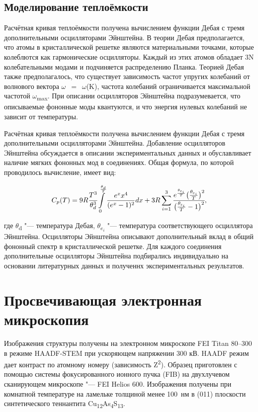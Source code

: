 \subsection{Моделирование теплоёмкости}\label{sect2_4_2}
Расчётная кривая теплоёмкости получена вычислением функции Дебая с тремя дополнительными осцилляторами Эйнштейна. В теории Дебая предполагается, что атомы в кристаллической решетке являются материальными точками, которые колеблются как гармонические осцилляторы.
Каждый из этих атомов обладает 3N колебательными модами и подчиняется распределению Планка.
Теорией Дебая также предполагалось, что существует зависимость частот упругих колебаний от волнового вектора $\omega$~$=$~$\omega$(K), частота колебаний ограничивается максимальной частотой $\omega$\textsubscript{max}. При описании осцилляторов Эйнштейна подразумевается, что описываемые фононные моды квантуются, и что энергия нулевых колебаний не зависит от температуры.

Расчётная кривая теплоёмкости получена вычислением функции Дебая с тремя дополнительными осцилляторами Эйнштейна. Добавление осцилляторов Эйнштейна обсуждается в описании экспериментальных данных и обуславливает наличие мягких фононных мод в соединениях. Общая формула, по которой проводилось вычисление, имеет вид:

\begin{equation}
  \label{eq:equation2_4}
C_p(T)=9R\cfrac{T^3}{\theta_d^3}\int\limits_0^{\frac{\theta_d}{T}}\frac{e^xx^4}{(e^x-1)^2}dx+3R\sum_{i=1}^3\cfrac{e^{\frac{\theta_{e_i}}{T}}\big(\frac{\theta_{e_i}}{T}\big)^2}{\big(\frac{\theta_{e_i}}{T}-1\big)^2},
\end{equation}

где $\theta$\textsubscript{d} "--- температура Дебая, $\theta$\textsubscript{$e_i$} "--- температура соответствующего осциллятора Эйнштейна.
Осцилляторы Эйнштейна описывают дополнительный вклад в общий фононный спектр в кристаллической решетке.
Для каждого соединения дополнительные осцилляторы Эйнштейна подбирались индивидуально на основании  литературных данных и полученнх экспериментальных результатов.
\newpage
\section{Просвечивающая электронная микроскопия} \label{sect2_4}

Изображения структуры получены на электронном микроскопе FEI Titan 80--300 в режиме HAADF-STEM  при ускоряющем напряжении 300 кВ.
HAADF режим дает контраст по атомному номеру (зависимость Z\textsuperscript{2}).
Образец приготовлен с помощью системы фокусированного ионного пучка (FIB) на двухлучевом сканирующем микроскопе "--- FEI Helios 600.
Изображения получены при комнатной температуре на ламельке толщиной менее 100~нм в (011) плоскости синтетического теннантита  Cu\textsubscript{12}As\textsubscript{4}S\textsubscript{13}.



